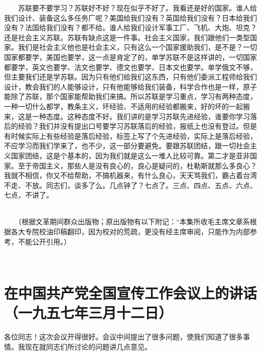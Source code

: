 \documentclass[cn,11pt,chinese]{elegantbook}
\def\myformat#1{\hfil\hfil #1}
\begin{document}
　　苏联要不要学习？苏联好不好？现在似乎不好了。我看还是好的国家。谁人给我们设计、装备这么多任务厂呢？美国给我们没有？英国给我们没有？日本给我们没有？法国给我们没有？都不给。谁人给我们设计军事工厂、飞机、大炮、坦克？还是社会主义苏联。苏联有缺点这是一件事。社会主义国家，我们跟他们一类型国家。我们是社会主义他也是社会主义，只有这么一个国家援助我们，是不是？一切国家都要学，美国也要学，这一点是肯定了的，单学苏联不是这样讲的，一切国家都要学，英文也要学、法文也要学、德文也要学、日本文也要学。单学俄文不够，但主要我们还是学苏联。因为只有他们给我们这东西，只有他们委派工程师给我们设计，教会我们的人能够设计，只有他能够给我们装备，科学合作也是一样，原子能除了苏联，那个国家能帮助我们来搞。所以苏联是学习重点，学习有两种态度，一种一切什么都学，教条主义，坏经验、不适用的经验都搬来，好的坏的一起搬来，这是一种态度。这种态度不好。我们讲的是学习苏联先进经验，谁要你学习落后的经验？我们并没有提出口号要学习苏联落后的经验，报纸上也没有登过。但是有时候实际上有些经验是落后经验，标签上写了个先进经验，实际上是落后经验，不应学习而我们学来了，也不少，这一部分要避免。要跟苏联团结，跟一切社会主义国家团结，这是个基本的，因为我们就是这么一堆人比较可靠。第二才是亚非国家。至于帝国主义，那些人是没有良心的，良心是疑问的，杜勒斯就那么多良心？我就不相信，你又不给帮助，不搞机器来，有什么良心，天天骂我们，霸占着台湾不走、不放。同志们，谈多了么。几点钟了？七点了。三点、四点、五点、六点、七点，不讲了。\\
　　\begin{flushright}
　　（根据文革期间群众出版物；原出版物有以下附记：“本集所收毛主席文章系根据各大专院校油印稿翻印，因为校对的荒疏，更没有经主席审阅，只能作为内部参考，不能公开引用。）
　　\end{flushright}
　　
\newpage\section*{\myformat{在中国共产党全国宣传工作会议上的讲话}\\\myformat{（一九五七年三月十二日）}}
各位同志！这次会议开得很好。会议中间提出了很多问题，使我们知道了很多事情。我现在就同志们所讨论的问题讲几点意见。\\
\end{document}

